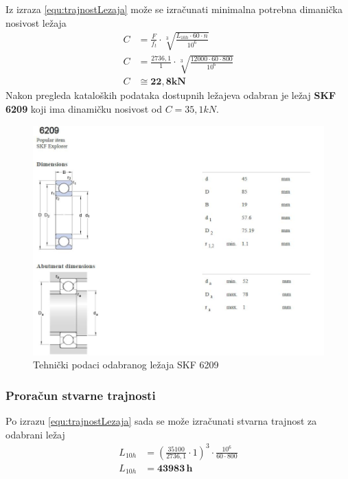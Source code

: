 \documentclass[11pt,a4paper]{article}
\begin{document}
Iz izraza \eqref{equ:trajnostLezaja} može se izračunati minimalna potrebna dimanička nosivost ležaja
\begin{align*}
C&=\frac{F}{f_t} \cdot \sqrt[3]{\frac{L_{10h} \cdot 60 \cdot n}{10^6}}\\
C&=\frac{2736,1}{1} \cdot \sqrt[3]{\frac{12000 \cdot 60 \cdot 800}{10^6}}\\
C&\cong \mathbf{22,8kN}
\end{align*}
Nakon pregleda kataloških podataka dostupnih ležajeva odabran je ležaj \textbf{SKF 6209} koji ima dinamičku nosivost od $C=35,1kN$.

\begin{figure}[!h]
\centering
\includegraphics[width=1\textwidth]{6209_data}
\caption{Tehnički podaci odabranog ležaja SKF 6209}\label{6208data}
\end{figure}

\subsubsection*{Proračun stvarne trajnosti}
Po izrazu \eqref{equ:trajnostLezaja} sada se može izračunati stvarna trajnost za odabrani ležaj
\begin{align*}
L_{10h}&=\left(\frac{35100}{2736,1} \cdot 1 \right)^3 \cdot \frac{10^6}{60 \cdot 800}\\
L_{10h}&=\mathbf{43983\, h}
\end{align*}

\newpage
\end{document}
